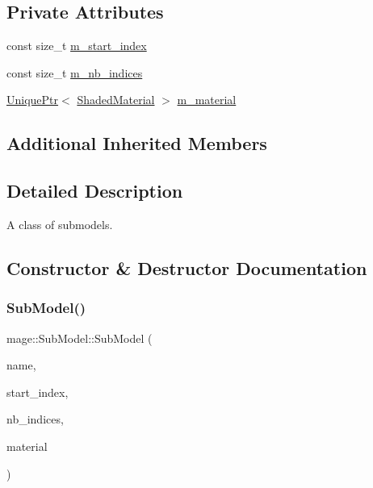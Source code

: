 \subsection*{Private Attributes}
\begin{DoxyCompactItemize}
\item 
const size\+\_\+t \hyperlink{classmage_1_1_sub_model_a22db3ac71a33ed64a26bb2e4410eeb28}{m\+\_\+start\+\_\+index}
\item 
const size\+\_\+t \hyperlink{classmage_1_1_sub_model_a0471b8b0c4b7be0e696378238b25e7e7}{m\+\_\+nb\+\_\+indices}
\item 
\hyperlink{namespacemage_a8c307fbcc33bce9b7f2aa4c26c3b95cf}{Unique\+Ptr}$<$ \hyperlink{structmage_1_1_shaded_material}{Shaded\+Material} $>$ \hyperlink{classmage_1_1_sub_model_a162ac42efa17ae49d14ce0fc42c7449c}{m\+\_\+material}
\end{DoxyCompactItemize}
\subsection*{Additional Inherited Members}


\subsection{Detailed Description}
A class of submodels. 

\subsection{Constructor \& Destructor Documentation}
\hypertarget{classmage_1_1_sub_model_a26dce7b076af1edb4209d0a236a250ef}{}\label{classmage_1_1_sub_model_a26dce7b076af1edb4209d0a236a250ef} 
\subsubsection{\texorpdfstring{Sub\+Model()}{SubModel()}\hspace{0.1cm}{\footnotesize\ttfamily [1/3]}}
{\footnotesize\ttfamily mage\+::\+Sub\+Model\+::\+Sub\+Model (\begin{DoxyParamCaption}\item[{const string \&}]{name,  }\item[{size\+\_\+t}]{start\+\_\+index,  }\item[{size\+\_\+t}]{nb\+\_\+indices,  }\item[{const \hyperlink{structmage_1_1_shaded_material}{Shaded\+Material} \&}]{material }\end{DoxyParamCaption})\hspace{0.3cm}{\ttfamily [explicit]}}

